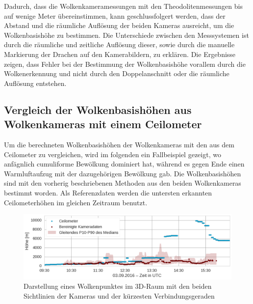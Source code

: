 \documentclass[a4paper,11pt,twoside,german]{article}
\newcommand{\absatz}{\smallbreak}
\begin{document}
Dadurch, dass die Wolkenkameramessungen mit den Theodolitenmessungen bis auf wenige Meter übereinstimmen, kann geschlussfolgert werden, dass der Abstand und die räumliche Auflösung der beiden Kameras ausreicht, um die Wolkenbasishöhe zu bestimmen. Die Unterschiede zwischen den Messsystemen ist durch die räumliche und zeitliche Auflösung dieser, sowie durch die manuelle Markierung der Drachen auf den Kamerabildern, zu erklären. Die Ergebnisse zeigen, dass Fehler bei der Bestimmung der Wolkenbasishöhe vorallem durch die Wolkenerkennung und nicht durch den Doppelanschnitt oder die räumliche Auflösung entstehen.

\subsection{Vergleich der Wolkenbasishöhen aus Wolkenkameras mit einem Ceilometer}
\label{SECCeilo}
Um die berechneten Wolkenbasishöhen der Wolkenkameras mit den aus dem Ceilometer zu vergleichen, wird im folgenden ein Fallbeispiel gezeigt, wo anfägnlich cumuliforme Bewölkung dominiert hat, während es gegen Ende einen Warmluftaufzug mit der dazugehörigen Bewölkung gab.\absatz
Die Wolkenbasishöhen sind mit den vorherig beschriebenen Methoden aus den beiden Wolkenkameras bestimmt worden. Als Referenzdaten werden die untersten erkannten Ceilometerhöhen im gleichen Zeitraum benutzt.\absatz
\begin{figure}[h]
	\begin{center}
		\includegraphics[width=1\textwidth]{media/ceilo_cam_new.png}
		\caption[Zeitreihenvergleich Wolkenkameras mit Ceilometer]{Darstellung eines Wolkenpunktes im 3D-Raum mit den beiden Sichtlinien der Kameras und der kürzesten Verbindungsgeraden}
		\label{FIGCeilo}
	\end{center}
\end{figure}
\end{document}
